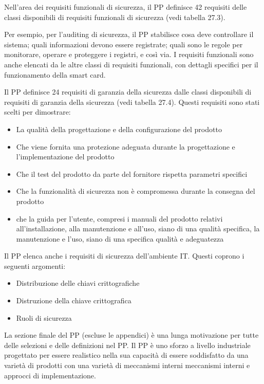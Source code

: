 \singlespacing

Nell'area dei requisiti funzionali di sicurezza, il PP definisce 42 requisiti delle classi disponibili di requisiti funzionali di sicurezza (vedi tabella 27.3).

\singlespacing

Per esempio, per l'auditing di sicurezza, il PP stabilisce cosa deve controllare il sistema; quali informazioni devono essere registrate; quali sono le regole per monitorare, operare e proteggere i registri, e così via. I requisiti funzionali sono anche elencati da le altre classi di requisiti funzionali, con dettagli specifici per il funzionamento della smart card.

\singlespacing

Il PP definisce 24 requisiti di garanzia della sicurezza dalle classi disponibili di requisiti di garanzia della sicurezza (vedi tabella 27.4). Questi requisiti sono stati scelti per dimostrare:

\begin{itemize}
    \item La qualità della progettazione e della configurazione del prodotto
    
    \item Che viene fornita una protezione adeguata durante la progettazione e l'implementazione del prodotto
    
    \item  Che il test del prodotto da parte del fornitore rispetta parametri specifici
    
    \item Che la funzionalità di sicurezza non è compromessa durante la consegna del prodotto
    
    \item che la guida per l'utente, compresi i manuali del prodotto relativi all'installazione, alla manutenzione e all'uso, siano di una qualità specifica, la manutenzione e l'uso, siano di una specifica qualità e adeguatezza
\end{itemize}
Il PP elenca anche i requisiti di sicurezza dell'ambiente IT. Questi coprono i seguenti argomenti:
\begin{itemize}
    \item Distribuzione delle chiavi crittografiche
    
    \item Distruzione della chiave crittografica
    
    \item Ruoli di sicurezza
\end{itemize}
La sezione finale del PP (escluse le appendici) è una lunga motivazione per tutte delle selezioni e delle definizioni nel PP. Il PP è uno sforzo a livello industriale progettato per essere realistico nella sua capacità di essere soddisfatto da una varietà di prodotti con una varietà di meccanismi interni meccanismi interni e approcci di implementazione.
\newpage
